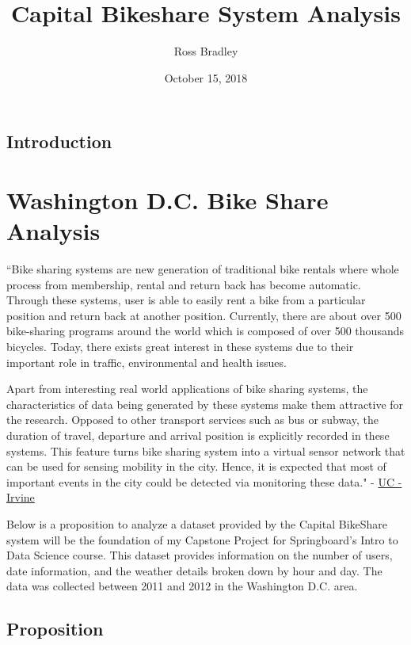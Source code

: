 \documentclass[]{article}
\title{Capital Bikeshare System Analysis}
\author{Ross Bradley}
\date{October 15, 2018}
\begin{document}
\maketitle

\subsection{Introduction}\label{introduction}

\section{Washington D.C. Bike Share
Analysis}\label{washington-d.c.-bike-share-analysis}

``Bike sharing systems are new generation of traditional bike rentals
where whole process from membership, rental and return back has become
automatic. Through these systems, user is able to easily rent a bike
from a particular position and return back at another position.
Currently, there are about over 500 bike-sharing programs around the
world which is composed of over 500 thousands bicycles. Today, there
exists great interest in these systems due to their important role in
traffic, environmental and health issues.

Apart from interesting real world applications of bike sharing systems,
the characteristics of data being generated by these systems make them
attractive for the research. Opposed to other transport services such as
bus or subway, the duration of travel, departure and arrival position is
explicitly recorded in these systems. This feature turns bike sharing
system into a virtual sensor network that can be used for sensing
mobility in the city. Hence, it is expected that most of important
events in the city could be detected via monitoring these data." -
\href{https://archive.ics.uci.edu/ml/datasets/Bike+Sharing+Dataset}{UC -
Irvine}

Below is a proposition to analyze a dataset provided by the Capital
BikeShare system will be the foundation of my Capstone Project for
Springboard's Intro to Data Science course. This dataset provides
information on the number of users, date information, and the weather
details broken down by hour and day. The data was collected between 2011
and 2012 in the Washington D.C. area.

\subsection{Proposition}\label{proposition}
\end{document}
